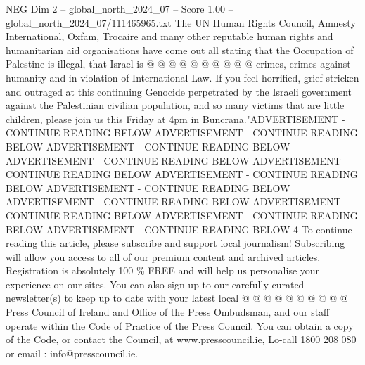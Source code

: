 \begin{textsample}{NEG Dim 2 – global\_north\_2024\_07 – Score 1.00 – global\_north\_2024\_07/111465965.txt}
The UN Human Rights Council, Amnesty International, Oxfam, Trocaire and many other reputable human rights and humanitarian aid organisations have come out all stating that the Occupation of Palestine is illegal, that Israel is @ @ @ @ @ @ @ @ @ @ crimes, crimes against humanity and in violation of International Law.
If you feel horrified, grief-stricken and outraged at this continuing Genocide perpetrated by the Israeli government against the Palestinian civilian population, and so many victims that are little children, please join us this Friday at 4pm in Buncrana."ADVERTISEMENT - CONTINUE READING BELOW ADVERTISEMENT - CONTINUE READING BELOW ADVERTISEMENT - CONTINUE READING BELOW ADVERTISEMENT - CONTINUE READING BELOW ADVERTISEMENT - CONTINUE READING BELOW ADVERTISEMENT - CONTINUE READING BELOW ADVERTISEMENT - CONTINUE READING BELOW ADVERTISEMENT - CONTINUE READING BELOW ADVERTISEMENT - CONTINUE READING BELOW ADVERTISEMENT - CONTINUE READING BELOW ADVERTISEMENT - CONTINUE READING BELOW 4 To continue reading this article, please subscribe and support local journalism!
Subscribing will allow you access to all of our premium content and archived articles.
Registration is absolutely 100 \% FREE and will help us personalise your experience on our sites.
You can also sign up to our carefully curated newsletter(s) to keep up to date with your latest local @ @ @ @ @ @ @ @ @ @ Press Council of Ireland and Office of the Press Ombudsman, and our staff operate within the Code of Practice of the Press Council.
You can obtain a copy of the Code, or contact the Council, at www.presscouncil.ie, Lo-call 1800 208 080 or email : info@presscouncil.ie.

\end{textsample}
